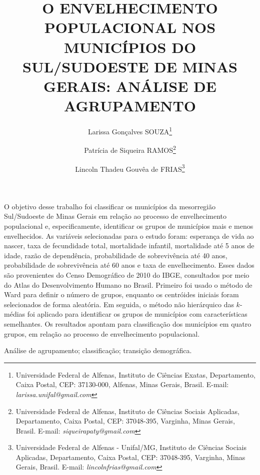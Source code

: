 \documentclass[10pt,twoside]{article}
\begin{document}
	
	\title{O ENVELHECIMENTO POPULACIONAL NOS MUNICÍPIOS DO SUL/SUDOESTE DE MINAS GERAIS: ANÁLISE DE AGRUPAMENTO}
	\author{Larissa Gonçalves SOUZA\thanks{%
			Universidade Federal de Alfenas, Instituto de Ciências Exatas, Departamento, Caixa Postal, CEP: 37130-000, Alfenas, Minas Gerais, Brasil. E-mail: {\it larissa.unifal@gmail.com}} \and
		Patrícia de Siqueira RAMOS\thanks{%
			Universidade Federal de Alfenas, Instituto de Ciências Sociais Aplicadas, Departamento, Caixa Postal, CEP: 37048-395, Varginha, Minas Gerais, Brasil. E-mail: {\it siqueirapaty@gmail.com}}
		\and Lincoln Thadeu Gouvêa de FRIAS\thanks{Universidade Federal de Alfenas - Unifal/MG, Instituto de Ciências Sociais Aplicadas, Departamento, Caixa Postal, CEP: 37048-395, Varginha, Minas Gerais, Brasil. E-mail: {\it lincolnfrias@gmail.com}} }
	\maketitle
	
	\begin{resumo}
	O objetivo desse trabalho foi classificar os municípios da mesorregião Sul/Sudoeste de Minas Gerais em relação ao processo de envelhecimento populacional e, especificamente, identificar os grupos de municípios mais e menos envelhecidos. As variáveis selecionadas para o estudo foram: esperança de vida ao nascer, taxa de fecundidade total, mortalidade infantil, mortalidade até 5 anos de idade, razão de dependência, probabilidade de sobrevivência até 40 anos, probabilidade de sobrevivência até 60 anos e taxa de envelhecimento. Esses dados são provenientes do Censo Demográfico de 2010 do IBGE, consultados por meio do Atlas do Desenvolvimento Humano no Brasil.
	Primeiro foi usado o método de Ward para definir o número de grupos, enquanto os centróides iniciais foram selecionados de forma aleatória. Em seguida, o método não hierárquico das $k$-médias foi aplicado para identificar os grupos de municípios com características semelhantes. Os resultados apontam para classificação dos municípios em quatro grupos, em relação ao processo de envelhecimento populacional.
	
\end{resumo}
	
	\begin{palavra:chave}
Análise de agrupamento; classificação; transição demográfica.	\end{palavra:chave}
	
\end{document}

